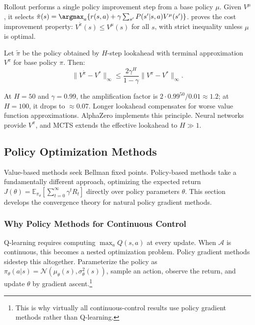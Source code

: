 Rollout performs a single policy improvement step from a base policy $\mu$. Given $V^\mu$, it selects $\tilde{\pi}(s) = \argmax_a \{ r(s,a) + \gamma \sum_{s'} P(s'|s,a) V^\mu(s') \}$. \citet{bertsekas2022} proves the cost improvement property: $V^{\tilde{\pi}}(s) \leq V^\mu(s)$ for all $s$, with strict inequality unless $\mu$ is optimal.

\begin{theorem}
\label{thm:rollout_error}
Let $\tilde{\pi}$ be the policy obtained by $H$-step lookahead with terminal approximation $V^\pi$ for base policy $\pi$. Then:
\begin{equation}
\|V^{\tilde{\pi}} - V^*\|_\infty \leq \frac{2\gamma^H}{1-\gamma} \|V^\pi - V^*\|_\infty.
\end{equation}
\end{theorem}

At $H=50$ and $\gamma=0.99$, the amplification factor is $2 \cdot 0.99^{50} / 0.01 \approx 1.2$; at $H=100$, it drops to $\approx 0.07$. Longer lookahead compensates for worse value function approximations. AlphaZero implements this principle. Neural networks provide $V^\pi$, and MCTS extends the effective lookahead to $H \gg 1$.


\subsection{Policy Optimization Methods}
\label{sec:policy_optimization}

Value-based methods seek Bellman fixed points. Policy-based methods take a fundamentally different approach, optimizing the expected return $J(\theta) = \mathbb{E}_{\pi_\theta}[\sum_{t=0}^\infty \gamma^t R_t]$ directly over policy parameters $\theta$. This section develops the convergence theory for natural policy gradient methods.

\subsubsection{Why Policy Methods for Continuous Control}

Q-learning requires computing $\max_a Q(s,a)$ at every update. When $\mathcal{A}$ is continuous, this becomes a nested optimization problem. Policy gradient methods sidestep this altogether. Parameterize the policy as $\pi_\theta(a|s) = \mathcal{N}(\mu_\theta(s), \sigma_\theta^2(s))$, sample an action, observe the return, and update $\theta$ by gradient ascent.\footnote{This is why virtually all continuous-control results use policy gradient methods rather than Q-learning.}

